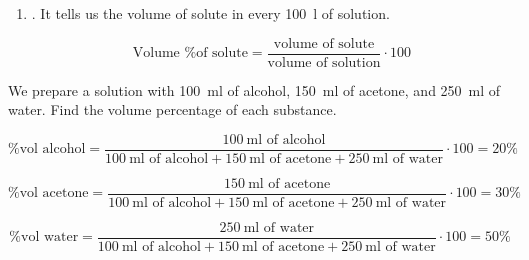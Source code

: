 \begin{enumerate}[label=\numberballmDarkTeal,resume]
\item {}.
It tells us the volume of solute in every \qty{100}{\litre} of solution.

\begin{equation}
    \text{Volume \% of solute} = \dfrac{\text{volume of solute}}{\text{volume of solution}}\cdot 100
\end{equation}
\end{enumerate}

\begin{example}
    We prepare a solution with \qty{100}{\ml} of alcohol, \qty{150}{\ml} of acetone, and \qty{250}{\ml} of water.
    Find the volume percentage of each substance.

    \begin{equation*}
        \text{\% vol alcohol} = \dfrac{\qty{100}{\ml}\text{ of alcohol}}{\qty{100}{\ml}\text{ of alcohol} + \qty{150}{\ml}\text{ of acetone} + \qty{250}{\ml}\text{ of water}}\cdot 100 = 20 \%
    \end{equation*}

    \begin{equation*}
        \text{\% vol acetone} = \dfrac{\qty{150}{\ml}\text{ of acetone}}{\qty{100}{\ml}\text{ of alcohol} + \qty{150}{\ml}\text{ of acetone} + \qty{250}{\ml}\text{ of water}}\cdot 100 = 30 \%
    \end{equation*}

    \begin{equation*}
        \text{\% vol water} = \dfrac{\qty{250}{\ml}\text{ of water}}{\qty{100}{\ml}\text{ of alcohol} + \qty{150}{\ml}\text{ of acetone} + \qty{250}{\ml}\text{ of water}}\cdot 100 = 50 \%
    \end{equation*}
\end{example}

